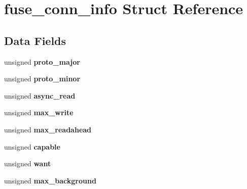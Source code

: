 \hypertarget{structfuse__conn__info}{}\section{fuse\+\_\+conn\+\_\+info Struct Reference}
\label{structfuse__conn__info}
\subsection*{Data Fields}
\begin{DoxyCompactItemize}
\item 
unsigned {\bfseries proto\+\_\+major}\hypertarget{structfuse__conn__info_a69c606abe81d16214d14ab58bad60062}{}\label{structfuse__conn__info_a69c606abe81d16214d14ab58bad60062}

\item 
unsigned {\bfseries proto\+\_\+minor}\hypertarget{structfuse__conn__info_a7a99196bc17f9b91622f6c1353da5f85}{}\label{structfuse__conn__info_a7a99196bc17f9b91622f6c1353da5f85}

\item 
unsigned {\bfseries async\+\_\+read}\hypertarget{structfuse__conn__info_a25c9b670226641a2ccdb6bd0c74082b6}{}\label{structfuse__conn__info_a25c9b670226641a2ccdb6bd0c74082b6}

\item 
unsigned {\bfseries max\+\_\+write}\hypertarget{structfuse__conn__info_ad5009eace718861580e1260d241432d9}{}\label{structfuse__conn__info_ad5009eace718861580e1260d241432d9}

\item 
unsigned {\bfseries max\+\_\+readahead}\hypertarget{structfuse__conn__info_acb560435478ca7bfb3dbf7df4c0f2dfe}{}\label{structfuse__conn__info_acb560435478ca7bfb3dbf7df4c0f2dfe}

\item 
unsigned {\bfseries capable}\hypertarget{structfuse__conn__info_a8a1c61f5d7cc14249fb6971165bb958e}{}\label{structfuse__conn__info_a8a1c61f5d7cc14249fb6971165bb958e}

\item 
unsigned {\bfseries want}\hypertarget{structfuse__conn__info_af45de81548b591f3004353a324e4e04d}{}\label{structfuse__conn__info_af45de81548b591f3004353a324e4e04d}

\item 
unsigned {\bfseries max\+\_\+background}\hypertarget{structfuse__conn__info_a5f9e695735727343448ae1e1a86dfa03}{}\label{structfuse__conn__info_a5f9e695735727343448ae1e1a86dfa03}


\end{DoxyCompactItemize}
